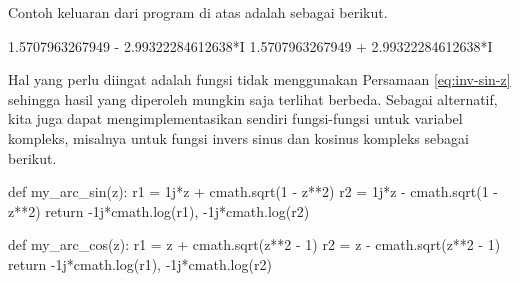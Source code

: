 Contoh keluaran dari program di atas adalah sebagai berikut.
\begin{textcode}
1.5707963267949 - 2.99322284612638*I
1.5707963267949 + 2.99322284612638*I
\end{textcode}

Hal yang perlu diingat adalah fungsi  tidak menggunakan Persamaan
\eqref{eq:inv-sin-z} sehingga hasil yang diperoleh mungkin saja terlihat berbeda.
Sebagai alternatif, kita juga dapat mengimplementasikan sendiri fungsi-fungsi 
untuk variabel kompleks, misalnya untuk fungsi invers sinus dan kosinus
kompleks sebagai berikut.
\begin{pythoncode}
def my_arc_sin(z):
    r1 = 1j*z + cmath.sqrt(1 - z**2)
    r2 = 1j*z - cmath.sqrt(1 - z**2)
    return -1j*cmath.log(r1), -1j*cmath.log(r2)

def my_arc_cos(z):
    r1 = z + cmath.sqrt(z**2 - 1)
    r2 = z - cmath.sqrt(z**2 - 1)
    return -1j*cmath.log(r1), -1j*cmath.log(r2)
\end{pythoncode}



